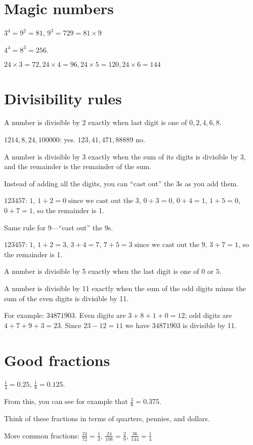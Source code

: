 \documentclass[fullpage,twocolumn]{article}
\begin{document}
\section{Magic numbers}
$3^4 = 9^2 = 81$, $9^3 = 729 = 81 \times 9$

$4^4 = 8^3 = 256$.

$24 \times 3 = 72, 24 \times 4 = 96, 24  \times 5 = 120, 24 \times 6 = 144$

\section{Divisibility rules}

A number is divisible by 2 exactly when last digit is one of $0,2,4,6,8$.

$1214, 8, 24, 100000$: yes. $123, 41, 471, 88889$ no.

A number is divisible by 3 exactly when the sum of its digits is divisible by
$3$, and the remainder is the remainder of the sum. 

Instead of adding all the digits, you can ``cast out'' the 3s as you add them.

$123457$: $1$, $1+2=0 \; \mbox{since we cast out the 3}$, $0+3 = 0$,
$0+4 = 1$, $1+5 = 0$, $0+7=1$, so the remainder is 1.

Same rule for 9---``cast out'' the 9s.

$123457$: $1$, $1+2=3$, $3+4 = 7$,
$7+5 = 3 \; \mbox{since we cast out the 9}$, 
$3+7=1$, so the remainder is 1.

A number is divisible by 5 exactly when the last digit is one of $0$ or $5$.

A number is divisible by 11 exactly when the sum of the odd digits minus the sum
of the even digits is divisible by 11.

For example: $34871903$. Even digits are $3+8+1+0=12$; odd
digits are $4+7+9+3=23$. Since $23-12=11$ we have $34871903$ is divisible by 11.


\section{Good fractions}

$\frac{1}{4} = 0.25$, $\frac{1}{8} = 0.125$. 

From this, you can see for example that $\frac{3}{8} = 0.375$. 

Think of these fractions in terms of quarters, pennies, and dollars.

More common fractions: 
$\frac{24}{72} = \frac{1}{3}$, $\frac{24}{108} = \frac{2}{9}$, $\frac{36}{144} = \frac{1}{4}$
\end{document}
